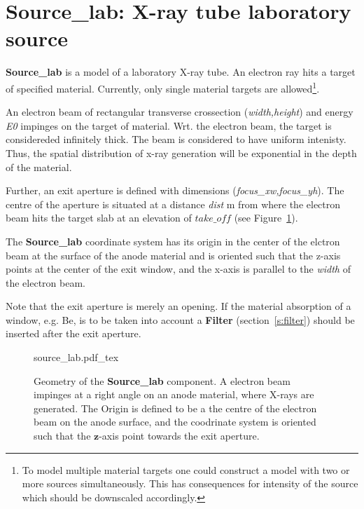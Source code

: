 \section{Source\_lab: X-ray tube laboratory source}
\label{s:source-lab}


\textbf{Source\_lab} is a model of a laboratory X-ray tube. An electron ray hits a
target of specified material. Currently, only single material targets are
allowed\footnote{To model multiple material targets one could construct a model with two
or more sources simultaneously. This has consequences for intensity of the source which should be downscaled accordingly.}.

An electron beam of rectangular transverse crossection (\emph{width,height}) and energy \emph{E0}
impinges on the target of material. Wrt. the electron beam, the target is
considereded infinitely thick. The beam is considered to have uniform
intenisty. Thus, the spatial distribution of x-ray generation will be
exponential in the depth of the material.

Further, an exit aperture is defined with dimensions
(\emph{focus\_xw,focus\_yh}). The centre of the aperture is situated at a
distance \emph{dist} \si{m} from where the electron beam hits the target slab
at an elevation of $take\_off$ (see Figure~\ref{f:source_lab}).  

The \textbf{Source\_lab} coordinate system has its origin in the center of the
elctron beam at the surface of the
anode material and is oriented such that the z-axis points at the center of the
exit window, and the x-axis is parallel to the \emph{width} of the electron
beam. 

Note that the exit aperture is merely an opening. If the
material absorption of a window, e.g. Be, is to be taken into account a
\textbf{Filter} (section~\ref{s:filter}) should be inserted after the exit
aperture. 

\begin{figure}
\label{f:source_lab}
\centering
\def\svgwidth{\columnwidth}
%
{source_lab.pdf_tex}
\caption{Geometry of the \textbf{Source\_lab} component. A electron beam impinges at a right angle on
an anode material, where X-rays are generated. The Origin is defined to be a the centre of the electron beam
on the anode surface, and the coodrinate system is oriented such that the $\boldsymbol{z}$-axis point towards
the exit aperture.} 
\end{figure}

